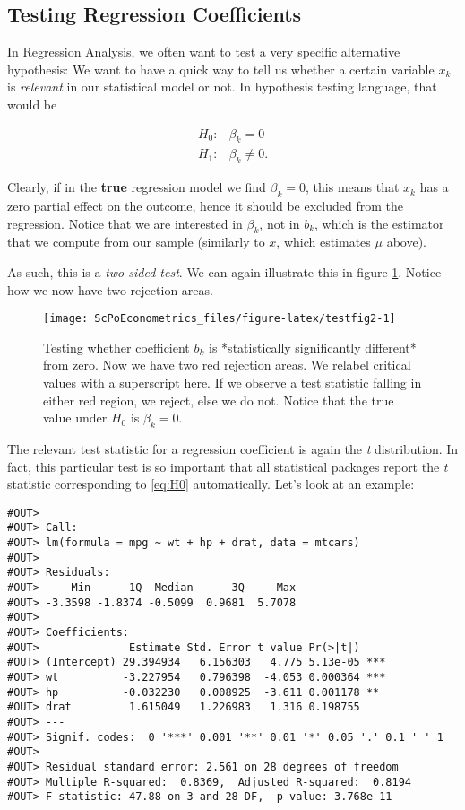 \documentclass[]{book}
\begin{document}
\subsection{Testing Regression
Coefficients}\label{testing-regression-coefficients}

In Regression Analysis, we often want to test a very specific
alternative hypothesis: We want to have a quick way to tell us whether a
certain variable \(x_k\) is \emph{relevant} in our statistical model or
not. In hypothesis testing language, that would be

\begin{align}
H_0:& \beta_k = 0\\
H_1:& \beta_k \neq 0.\label{eq:H0}
\end{align}

Clearly, if in the \textbf{true} regression model we find \(\beta_k=0\),
this means that \(x_k\) has a zero partial effect on the outcome, hence
it should be excluded from the regression. Notice that we are interested
in \(\beta_k\), not in \(b_k\), which is the estimator that we compute
from our sample (similarly to \(\bar{x}\), which estimates \(\mu\)
above).

As such, this is a \emph{two-sided test}. We can again illustrate this
in figure \ref{fig:testfig2}. Notice how we now have two rejection
areas.

\begin{figure}

{\centering \texttt{[image: ScPoEconometrics\_files/figure-latex/testfig2-1]} 

}

\caption{Testing whether coefficient $b_k$ is *statistically significantly different* from zero. Now we have two red rejection areas. We relabel critical values with a superscript here. If we observe a test statistic falling in either red region, we reject, else we do not. Notice that the true value under $H_0$ is $\beta_k=0$. }\label{fig:testfig2}
\end{figure}

The relevant test statistic for a regression coefficient is again the
\emph{t} distribution. In fact, this particular test is so important
that all statistical packages report the \emph{t} statistic
corresponding to \eqref{eq:H0} automatically. Let's look at an example:

\begin{verbatim}
#OUT> 
#OUT> Call:
#OUT> lm(formula = mpg ~ wt + hp + drat, data = mtcars)
#OUT> 
#OUT> Residuals:
#OUT>     Min      1Q  Median      3Q     Max 
#OUT> -3.3598 -1.8374 -0.5099  0.9681  5.7078 
#OUT> 
#OUT> Coefficients:
#OUT>              Estimate Std. Error t value Pr(>|t|)    
#OUT> (Intercept) 29.394934   6.156303   4.775 5.13e-05 ***
#OUT> wt          -3.227954   0.796398  -4.053 0.000364 ***
#OUT> hp          -0.032230   0.008925  -3.611 0.001178 ** 
#OUT> drat         1.615049   1.226983   1.316 0.198755    
#OUT> ---
#OUT> Signif. codes:  0 '***' 0.001 '**' 0.01 '*' 0.05 '.' 0.1 ' ' 1
#OUT> 
#OUT> Residual standard error: 2.561 on 28 degrees of freedom
#OUT> Multiple R-squared:  0.8369,  Adjusted R-squared:  0.8194 
#OUT> F-statistic: 47.88 on 3 and 28 DF,  p-value: 3.768e-11
\end{verbatim}
\end{document}
